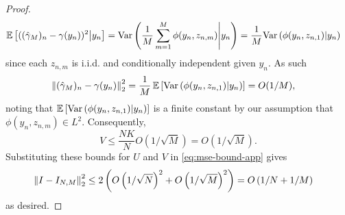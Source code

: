 \begin{proof}
\begin{align*}
	\mathbb{E} &\left[ ((\hat{\gamma}_M)_n - \gamma(y_n))^2 \middle| y_n \right]
	= \mathrm{Var}\left(\frac{1}{M} \sum_{m=1}^M \phi(y_n, z_{n,m}) \middle| y_n \right) 
	= \frac{1}{M} \mathrm{Var}\left(\phi(y_n, z_{n,1}) \middle| y_n \right)
	\end{align*}
	since each $z_{n,m}$ is i.i.d. and conditionally independent given $y_n$. As
	such
	\begin{align*}
	\left\lVert(\hat{\gamma}_M)_n - \gamma(y_n)\right\rVert_2^2
	&= \frac{1}{M} \, \mathbb{E} \left[ \mathrm{Var} \left(\phi(y_n, z_{n,1}) \middle| y_n \right)\right] 
	= O(1/M),
	\end{align*}
	noting that $\mathbb{E} \left[ \mathrm{Var} \left(\phi(y_n, z_{n,1}) \middle| y_n \right)\right]$ is a
	finite constant by our assumption that $\phi(y_n, z_{n,m}) \in L^2$. Consequently,
	\[
	V \leq \frac{NK}{N} O\left(1/\sqrt{M}\right) = O\left(1/\sqrt{M}\right).
	\]
	Substituting these bounds for $U$ and $V$ in \eqref{eq:mse-bound-app} gives
	\begin{align*}
	\left\lVert I - I_{N,M}\right\rVert_2^2
	&\leq 2\left(O\left(1/\sqrt{N}\right)^2 + O\left(1/\sqrt{M}\right)^2\right) 
	= O\left(1/N + 1/M\right)
	\end{align*}
	as desired.
\end{proof}